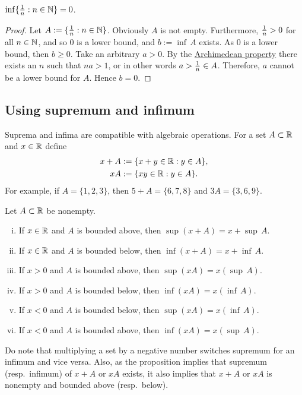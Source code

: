 \begin{cor}
$\inf \{ \nicefrac{1}{n} : n \in \N \} = 0$.
\end{cor}

\begin{proof}
Let $A := \{ \nicefrac{1}{n} : n \in \N \}$.  Obviously $A$ is not empty.
Furthermore,
$\nicefrac{1}{n} > 0$ for all $n \in \N$, and so 0 is a lower bound, and $b := \inf\, A$ exists.
As 0 is a lower bound, then $b \geq 0$.
Take an arbitrary $a > 0$.  By the
\hyperref[thm:arch:i]{Archimedean property} there exists an $n$ such that
$na > 1$, or in other words $a > \nicefrac{1}{n} \in A$.  Therefore,
$a$ cannot be a lower bound for $A$.  Hence $b=0$.
\end{proof}

\subsection{Using supremum and infimum}

Suprema and infima are
compatible with algebraic operations.  For a set $A \subset \R$ and 
$x \in \R$ define
\begin{align*}
x + A & := \{ x+y \in \R : y \in A \} , \\
xA & := \{ xy \in \R : y \in A \} .
\end{align*}
For example, if $A = \{ 1,2,3 \}$, then $5+A = \{ 6,7,8 \}$ and $3A = \{ 3,6,9
\}$.

\begin{prop} \label{prop:supinfalg}
Let $A \subset \R$ be nonempty.
\begin{enumerate}[(i)]
\item If $x \in \R$ and $A$ is bounded above, then $\sup (x+A) = x + \sup\, A$.
\item If $x \in \R$ and $A$ is bounded below, then $\inf (x+A) = x + \inf\, A$.
\item If $x > 0$ and $A$ is bounded above, then $\sup (xA) = x ( \sup\, A )$.
\item If $x > 0$ and $A$ is bounded below, then $\inf (xA) = x ( \inf\, A )$.
\item If $x < 0$ and $A$ is bounded below, then $\sup (xA) = x ( \inf\, A )$.
\item If $x < 0$ and $A$ is bounded above, then $\inf (xA) = x ( \sup\, A )$.
\end{enumerate}
\end{prop}

Do note that multiplying a set by a negative number switches supremum for an
infimum and vice versa.  Also, as the proposition implies that
supremum (resp.\ infimum) of $x+A$ or $xA$ exists, 
it also implies that $x+A$ or $xA$
is nonempty and bounded above (resp.\ below).

